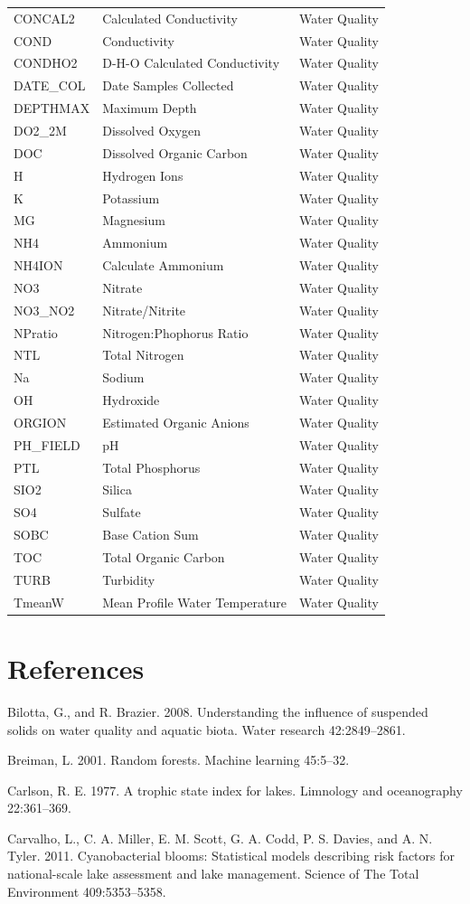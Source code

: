 \documentclass[12pt,]{article}
\begin{document}
\begin{longtable}[c]{@{}lll@{}}
CONCAL2 & Calculated Conductivity & Water Quality\tabularnewline
COND & Conductivity & Water Quality\tabularnewline
CONDHO2 & D-H-O Calculated Conductivity & Water Quality\tabularnewline
DATE\_COL & Date Samples Collected & Water Quality\tabularnewline
DEPTHMAX & Maximum Depth & Water Quality\tabularnewline
DO2\_2M & Dissolved Oxygen & Water Quality\tabularnewline
DOC & Dissolved Organic Carbon & Water Quality\tabularnewline
H & Hydrogen Ions & Water Quality\tabularnewline
K & Potassium & Water Quality\tabularnewline
MG & Magnesium & Water Quality\tabularnewline
NH4 & Ammonium & Water Quality\tabularnewline
NH4ION & Calculate Ammonium & Water Quality\tabularnewline
NO3 & Nitrate & Water Quality\tabularnewline
NO3\_NO2 & Nitrate/Nitrite & Water Quality\tabularnewline
NPratio & Nitrogen:Phophorus Ratio & Water Quality\tabularnewline
NTL & Total Nitrogen & Water Quality\tabularnewline
Na & Sodium & Water Quality\tabularnewline
OH & Hydroxide & Water Quality\tabularnewline
ORGION & Estimated Organic Anions & Water Quality\tabularnewline
PH\_FIELD & pH & Water Quality\tabularnewline
PTL & Total Phosphorus & Water Quality\tabularnewline
SIO2 & Silica & Water Quality\tabularnewline
SO4 & Sulfate & Water Quality\tabularnewline
SOBC & Base Cation Sum & Water Quality\tabularnewline
TOC & Total Organic Carbon & Water Quality\tabularnewline
TURB & Turbidity & Water Quality\tabularnewline
TmeanW & Mean Profile Water Temperature & Water Quality\tabularnewline
\bottomrule
\end{longtable}

\newpage

\section*{References}\label{references}

Bilotta, G., and R. Brazier. 2008. Understanding the influence of
suspended solids on water quality and aquatic biota. Water research
42:2849--2861.

Breiman, L. 2001. Random forests. Machine learning 45:5--32.

Carlson, R. E. 1977. A trophic state index for lakes. Limnology and
oceanography 22:361--369.

Carvalho, L., C. A. Miller, E. M. Scott, G. A. Codd, P. S. Davies, and
A. N. Tyler. 2011. Cyanobacterial blooms: Statistical models describing
risk factors for national-scale lake assessment and lake management.
Science of The Total Environment 409:5353--5358.
\end{document}
